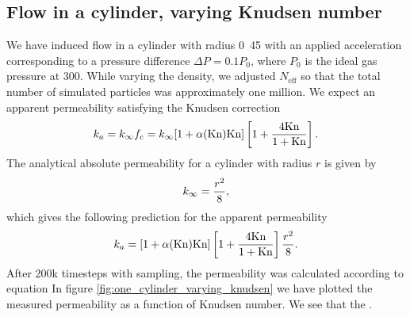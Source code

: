 \subsection{Flow in a cylinder, varying Knudsen number}
We have induced flow in a cylinder with radius \unit{0.45}{\micro\meter} with an applied acceleration corresponding to a pressure difference $\Delta P = 0.1P_0$, where $P_0$ is the ideal gas pressure at \unit{300}{\kelvin}. While varying the density, we adjusted $N_\text{eff}$ so that the total number of simulated particles was approximately one million. We expect an apparent permeability satisfying the Knudsen correction
\begin{align}
	k_a = k_\infty f_c = k_\infty[1 + \alpha(\text{Kn})\text{Kn}]\left[1 + {4\text{Kn}\over 1 + \text{Kn}}\right].
\end{align}
The analytical absolute permeability for a cylinder with radius $r$ is given by\cite{karniadakis2005microflows}
\begin{align}
	\label{eq:permeability_cylinder}
	k_\infty = {r^2\over 8},
\end{align}
which gives the following prediction for the apparent permeability
\begin{align}
	k_a = [1 + \alpha(\text{Kn})\text{Kn}]\left[1 + {4\text{Kn}\over 1 + \text{Kn}}\right] {r^2\over 8}.
\end{align}
After 200k timesteps with sampling, the permeability was calculated according to equation 
In figure \ref{fig:one_cylinder_varying_knudsen} we have plotted the measured permeability as a function of Knudsen number. We see that the .

